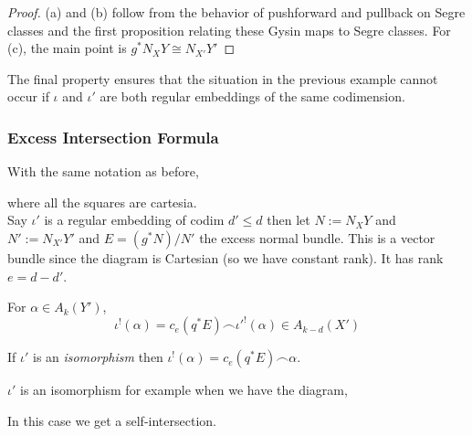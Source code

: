 \documentclass[12pt]{article}
\begin{document}
\begin{proof}
(a) and (b) follow from the behavior of pushforward and pullback on Segre classes and the first proposition relating these Gysin maps to Segre classes. For (c), the main point is $g^* N_X Y \cong N_{X'} Y'$ 
\end{proof}

\begin{rmk}
The final property ensures that the situation in the previous example cannot occur if $\iota$ and $\iota'$ are both regular embeddings of the same codimension. 
\end{rmk}

\subsubsection{Excess Intersection Formula}

With the same notation as before,
\begin{center}
\end{center}
where all the squares are cartesia.
\bigskip\\

Say $\iota'$ is a regular embedding of codim $d' \le d$ then let $N := N_X Y$ and $N' := N_{X'} Y'$ and $E = (g^* N) / N'$ the excess normal bundle. This is a vector bundle since the diagram is Cartesian (so we have constant rank). It has rank $e = d - d'$.

\begin{theorem}
For $\alpha \in A_k(Y')$,
\[ \iota^!(\alpha) = c_e(q^* E) \frown \iota'^!(\alpha) \in A_{k-d}(X') \]
\end{theorem}

\begin{cor}
If $\iota'$ is an \textit{isomorphism} then $\iota^!(\alpha) = c_e(q^* E) \frown \alpha$.
\end{cor}

\begin{rmk}
$\iota'$ is an isomorphism for example when we have the diagram,
\begin{center}
\end{center}
In this case we get a self-intersection.
\end{rmk}
\end{document}
